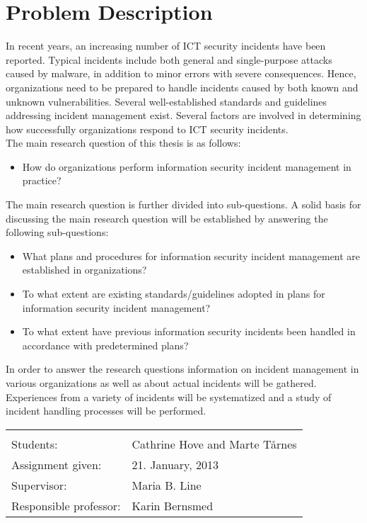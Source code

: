 \documentclass[b5paper, twoside, openright, 11pt]{report}
\begin{document}
\chapter*{Problem Description}
\vspace{-0.2cm}
In recent years, an increasing number of ICT security incidents have been reported. Typical incidents include both general and single-purpose attacks caused by malware, in addition to minor errors with severe consequences. Hence, organizations need to be prepared to handle incidents caused by both known and unknown vulnerabilities. Several well-established standards and guidelines addressing incident management exist. Several factors are involved in determining how successfully organizations respond to ICT security incidents. \\

The main research question of this thesis is as follows: 
\begin{itemize}
\item How do organizations perform information security incident management in practice?
\end{itemize}

The main research question is further divided into sub-questions. A solid basis for discussing the main research question will be established by answering the following sub-questions:\\

\begin{itemize}\itemsep-0.1cm
\item What plans and procedures for information security incident management are established in organizations?
\item To what extent are existing standards/guidelines adopted in plans for information security incident management?
\item To what extent have previous information security incidents been handled in accordance with predetermined plans? 
\end{itemize}

In order to answer the research questions information on incident management in various organizations as well as about actual incidents will be gathered. Experiences from a variety of incidents will be systematized and a study of incident handling processes will be performed.


\begin{tabular}{@{}p{4cm}l}
\vspace{0.1cm} & \vspace{0.1cm} \\
Students:		& Cathrine Hove and Marte T\aa rnes \\
Assignment given: & 21. January, 2013 \\
Supervisor:		& Maria B. Line \\
Responsible professor: 	& Karin Bernsmed 
\end{tabular}
\end{document}
